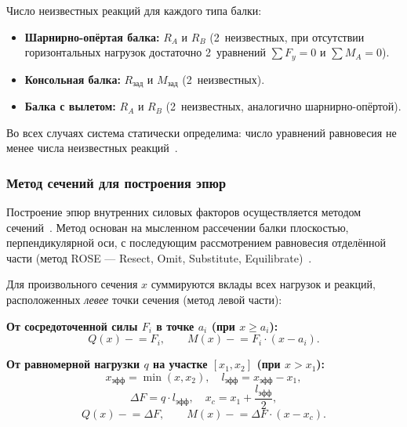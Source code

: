 Число неизвестных реакций для каждого типа балки:
\begin{itemize}
  \item \textbf{Шарнирно-опёртая балка:} $R_A$ и $R_B$ (2~неизвестных, при отсутствии горизонтальных нагрузок достаточно 2~уравнений $\sum F_y = 0$ и $\sum M_A = 0$).
  \item \textbf{Консольная балка:} $R_{\text{зад}}$ и $M_{\text{зад}}$ (2~неизвестных).
  \item \textbf{Балка с вылетом:} $R_A$ и $R_B$ (2~неизвестных, аналогично шарнирно-опёртой).
\end{itemize}

Во всех случаях система статически определима: число уравнений равновесия не менее числа неизвестных реакций~\cite{darkov}.

\subsubsection{Метод сечений для построения эпюр}

Построение эпюр внутренних силовых факторов осуществляется методом сечений~\cite{feodosev, pisarenko}. Метод основан на мысленном рассечении балки плоскостью, перпендикулярной оси, с последующим рассмотрением равновесия отделённой части (метод ROSE --- Resect, Omit, Substitute, Equilibrate)~\cite{hibbeler2016}.

Для произвольного сечения $x$ суммируются вклады всех нагрузок и реакций, расположенных \textit{левее} точки сечения (метод левой части):

\textbf{От сосредоточенной силы $F_i$ в точке $a_i$ (при $x \geq a_i$):}
\begin{equation}
  Q(x) \mathrel{-}= F_i, \qquad M(x) \mathrel{-}= F_i \cdot (x - a_i).
  \label{eq:section_point}
\end{equation}

\textbf{От равномерной нагрузки $q$ на участке $[x_1, x_2]$ (при $x > x_1$):}
\begin{equation}
  x_{\text{эфф}} = \min(x, x_2), \quad l_{\text{эфф}} = x_{\text{эфф}} - x_1,
  \label{eq:section_uniform_1}
\end{equation}
\begin{equation}
  \Delta F = q \cdot l_{\text{эфф}}, \quad x_c = x_1 + \frac{l_{\text{эфф}}}{2},
  \label{eq:section_uniform_2}
\end{equation}
\begin{equation}
  Q(x) \mathrel{-}= \Delta F, \qquad M(x) \mathrel{-}= \Delta F \cdot (x - x_c).
  \label{eq:section_uniform_3}
\end{equation}

